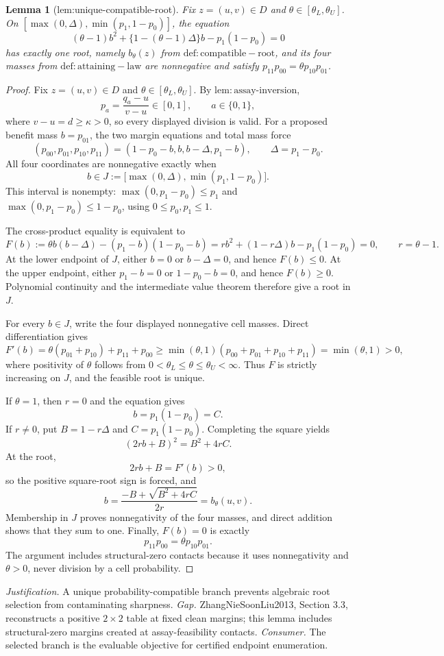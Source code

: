 \documentclass{article}
\newtheorem{lemma}{Lemma}
\begin{document}
\begin{lemma}[lem:unique-compatible-root]\label{lem:unique-compatible-root}
Fix \(z=(u,v)\in D\) and \(\theta\in[\theta_L,\theta_U]\). On \([\max(0,\Delta),\min(p_1,1-p_0)]\), the equation \[(\theta-1)b^2+\{1-(\theta-1)\Delta\}b-p_1(1-p_0)=0\] has exactly one root, namely \(b_{\theta}(z)\) from \(\mathrm{def:compatible-root}\), and its four masses from \(\mathrm{def:attaining-law}\) are nonnegative and satisfy \(p_{11}p_{00}=\theta p_{10}p_{01}\).
\end{lemma}
\begin{proof}
Fix \(z=(u,v)\in D\) and \(\theta\in[\theta_L,\theta_U]\). By \(\mathrm{lem:assay\text{-}inversion}\),
\[
p_a=\frac{q_a-u}{v-u}\in[0,1],\qquad a\in\{0,1\},
\]
where \(v-u=d\geq\kappa>0\), so every displayed division is valid. For a proposed benefit mass \(b=p_{01}\), the two margin equations and total mass force
\[
(p_{00},p_{01},p_{10},p_{11})
=(1-p_0-b,b,b-\Delta,p_1-b),
\qquad \Delta=p_1-p_0.
\]
All four coordinates are nonnegative exactly when
\[
b\in J:=\bigl[\max(0,\Delta),\min(p_1,1-p_0)\bigr].
\]
This interval is nonempty: \(\max(0,p_1-p_0)\leq p_1\) and \(\max(0,p_1-p_0)\leq1-p_0\), using \(0\leq p_0,p_1\leq1\).

The cross-product equality is equivalent to
\[
F(b):=\theta b(b-\Delta)-(p_1-b)(1-p_0-b)
=r b^2+(1-r\Delta)b-p_1(1-p_0)=0,
\qquad r=\theta-1.
\]
At the lower endpoint of \(J\), either \(b=0\) or \(b-\Delta=0\), and hence \(F(b)\leq0\). At the upper endpoint, either \(p_1-b=0\) or \(1-p_0-b=0\), and hence \(F(b)\geq0\). Polynomial continuity and the intermediate value theorem therefore give a root in \(J\).

For every \(b\in J\), write the four displayed nonnegative cell masses. Direct differentiation gives
\[
F'(b)=\theta(p_{01}+p_{10})+p_{11}+p_{00}
\geq \min(\theta,1)
(p_{00}+p_{01}+p_{10}+p_{11})
=\min(\theta,1)>0,
\]
where positivity of \(\theta\) follows from \(0<\theta_L\leq\theta\leq\theta_U<\infty\). Thus \(F\) is strictly increasing on \(J\), and the feasible root is unique.

If \(\theta=1\), then \(r=0\) and the equation gives
\[
b=p_1(1-p_0)=C.
\]
If \(r\neq0\), put \(B=1-r\Delta\) and \(C=p_1(1-p_0)\). Completing the square yields
\[
(2rb+B)^2=B^2+4rC.
\]
At the root,
\[
2rb+B=F'(b)>0,
\]
so the positive square-root sign is forced, and
\[
b=\frac{-B+\sqrt{B^2+4rC}}{2r}=b_\theta(u,v).
\]
Membership in \(J\) proves nonnegativity of the four masses, and direct addition shows that they sum to one. Finally, \(F(b)=0\) is exactly
\[
p_{11}p_{00}=\theta p_{10}p_{01}.
\]
The argument includes structural-zero contacts because it uses nonnegativity and \(\theta>0\), never division by a cell probability.
\end{proof}
\par\smallskip\noindent \textit{Justification.} A unique probability-compatible branch prevents algebraic root selection from contaminating sharpness. \textit{Gap.} ZhangNieSoonLiu2013, Section 3.3, reconstructs a positive \(2\times2\) table at fixed clean margins; this lemma includes structural-zero margins created at assay-feasibility contacts. \textit{Consumer.} The selected branch is the evaluable objective for certified endpoint enumeration.
\end{document}
